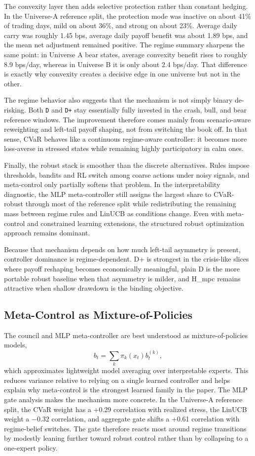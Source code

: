 \documentclass[10pt,twocolumn]{article}
\begin{document}
The convexity layer then adds selective protection rather than constant
hedging. In the Universe-A reference split, the protection mode was inactive on
about 41\% of trading days, mild on about 36\%, and strong on about 23\%.
Average daily carry was roughly 1.45 bps, average daily payoff benefit was
about 1.89 bps, and the mean net adjustment remained positive. The regime
summary sharpens the same point: in Universe A bear states, average convexity
benefit rises to roughly 8.9 bps/day, whereas in Universe B it is only about
2.4 bps/day. That difference is exactly why convexity creates a decisive edge
in one universe but not in the other.

The regime behavior also suggests that the mechanism is not simply binary
de-risking. Both \texttt{D} and \texttt{D+} stay essentially fully invested in
the crash, bull, and bear reference windows. The improvement therefore comes
mainly from scenario-aware reweighting and left-tail payoff shaping, not from
switching the book off. In that sense, CVaR behaves like a continuous
regime-aware controller: it becomes more loss-averse in stressed states while
remaining highly participatory in calm ones.

Finally, the robust stack is smoother than the discrete alternatives. Rules
impose thresholds, bandits and RL switch among coarse actions under noisy
signals, and meta-control only partially softens that problem. In the
interpretability diagnostic, the MLP meta-controller still assigns the largest
share to CVaR-robust through most of the reference split while redistributing
the remaining mass between regime rules and LinUCB as conditions change. Even
with meta-control and constrained learning extensions, the structured robust
optimization approach remains dominant.

Because that mechanism depends on how much left-tail asymmetry is present,
controller dominance is regime-dependent. D+ is strongest in the crisis-like
slices where payoff reshaping becomes economically meaningful, plain D is the
more portable robust baseline when that asymmetry is milder, and H\_mpc remains
attractive when shallow drawdown is the binding objective.

\subsection{Meta-Control as Mixture-of-Policies}

The council and MLP meta-controller are best understood as
mixture-of-policies models,
\[
b_t = \sum_k \pi_k(x_t) b_t^{(k)},
\]
which approximates lightweight model averaging over interpretable experts. This
reduces variance relative to relying on a single learned controller and helps
explain why meta-control is the strongest learned family in the paper. The MLP
gate analysis makes the mechanism more concrete. In the Universe-A reference
split, the CVaR weight has a +0.29 correlation with realized stress, the
LinUCB weight a $-0.32$ correlation, and aggregate gate shifts a +0.61
correlation with regime-belief switches. The gate therefore reacts most around
regime transitions by modestly leaning further toward robust control rather
than by collapsing to a one-expert policy.
\end{document}
